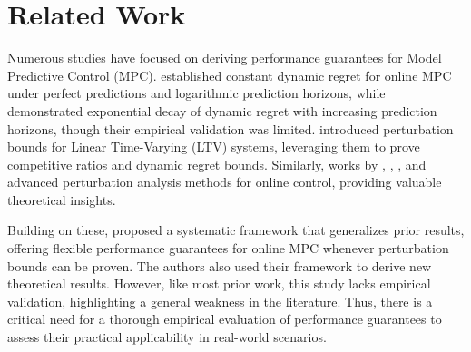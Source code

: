 \section{Related Work}
Numerous studies have focused on deriving performance guarantees for Model Predictive Control (MPC). \cite{yu2020power} established constant dynamic regret for online MPC under perfect predictions and logarithmic prediction horizons, while \cite{zhang2021regret} demonstrated exponential decay of dynamic regret with increasing prediction horizons, though their empirical validation was limited. \cite{lin2021perturbation} introduced perturbation bounds for Linear Time-Varying (LTV) systems, leveraging them to prove competitive ratios and dynamic regret bounds. Similarly, works by \cite{shin2020decentralized}, \cite{shin2021controllability}, \cite{xu2019exponentially}, and \cite{na2022superconvergence} advanced perturbation analysis methods for online control, providing valuable theoretical insights.

Building on these, \cite{lin2022bounded} proposed a systematic framework that generalizes prior results, offering flexible performance guarantees for online MPC whenever perturbation bounds can be proven. The authors also used their framework to derive new theoretical results. However, like most prior work, this study lacks empirical validation, highlighting a general weakness in the literature. Thus, there is a critical need for a thorough empirical evaluation of performance guarantees to assess their practical applicability in real-world scenarios.